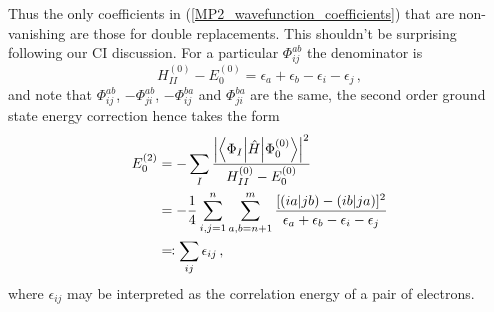 \documentclass{article}
\theoremstyle{plain}\theoremheaderfont{\normalfont\itshape}\theorembodyfont{\rmfamily}\theoremseparator{.}\newtheorem*{rem}{Remark}\newtheorem*{ex}{Example}\newtheorem*{proof}{Proof}\newtheorem*{altp}{Alternative proof}
\theoremstyle{plain}\theoremheaderfont{\normalfont\bfseries}\theorembodyfont{\rmfamily}\theoremseparator{.}\newtheorem{thm}{Theorem}[section]\newtheorem{lem}[thm]{Lemma}\newtheorem{prop}[thm]{Proposition}\newtheorem*{cor}{Corollary}\newtheorem{defn}[thm]{Definition}\newtheorem{clm}[thm]{Claim}\newtheorem{clminproof}{Claim}
\theoremstyle{break}\theoremheaderfont{\normalfont\itshape}\theorembodyfont{\rmfamily}\theoremseparator{.\medskip}\newtheorem*{proofskip}{Proof}\newtheorem*{exs}{Examples}\newtheorem*{rems}{Remarks}
\theoremstyle{break}\theoremheaderfont{\normalfont\bfseries}\theorembodyfont{\rmfamily}\theoremseparator{.\medskip}\newtheorem{lemskip}[thm]{Lemma}\newtheorem{defnskip}[thm]{Definition}\newtheorem{propskip}[thm]{Proposition}\newtheorem{thmskip}[thm]{Theorem}
\numberwithin{equation}{section}
\newcommand{\mel}[3]{\left\langle #1 \middle| #2 \middle| #3 \right\rangle}
\newcommand{\abs}[1]{\left| #1 \right|}
\newcommand{\bracket}[2]{\left( #1 \middle| #2 \right)}
\begin{document}
    Thus the only coefficients in (\ref{MP2_wavefunction_coefficients}) that are non-vanishing are those for double replacements. This shouldn't be surprising following our CI discussion. For a particular \(\Phi_{ij}^{ab}\) the denominator is
    \begin{equation}
        H_{II}^{(0)}-E_0^{(0)}=\epsilon_a+\epsilon_b-\epsilon_i-\epsilon_j\,,
    \end{equation}
    and note that \(\Phi_{ij}^{ab}\), \(-\Phi_{ji}^{ab}\), \(-\Phi_{ij}^{ba}\) and \(\Phi_{ji}^{ba}\) are the same, the second order ground state energy correction hence takes the form
    \begin{align}
        E_0^{(2)}&=-\sum_{I}\frac{\abs{\mel{\Phi_I}{\hat{H}}{\Phi^{(0)}_0}}^2}{H_{II}^{(0)}-E_0^{(0)}}\notag\\
        &=-\frac{1}{4}\sum_{i,j=1}^{n}\sum_{a,b=n+1}^{m}\frac{[\bracket{ia}{jb}-\bracket{ib}{ja}]^2}{\epsilon_a+\epsilon_b-\epsilon_i-\epsilon_j} \label{MP2_energy_correction}\notag\\
        &\eqqcolon\sum_{ij}\epsilon_{ij}\,,
    \end{align}
    where \(\epsilon_{ij}\) may be interpreted as the correlation energy of a pair of electrons.
\end{document}
